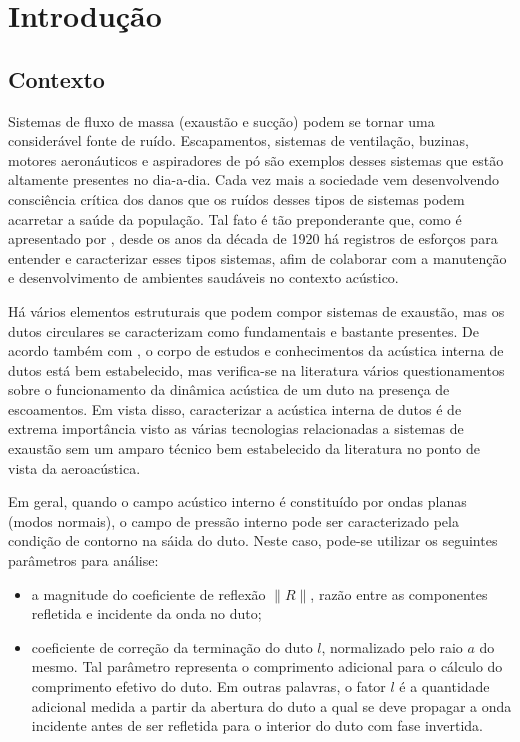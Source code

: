 \chapter{Introdução}
\label{chapter:introdcao}

\section{Contexto}

Sistemas de fluxo de massa (exaustão e sucção) podem se tornar uma considerável fonte de ruído. Escapamentos, sistemas de ventilação, buzinas, motores aeronáuticos e aspiradores de pó são exemplos desses sistemas que estão altamente presentes no dia-a-dia. Cada vez mais a sociedade vem desenvolvendo consciência crítica dos danos que os ruídos desses tipos de sistemas podem acarretar a saúde da população. Tal fato é tão preponderante que, como é apresentado por , desde os anos da década de 1920 há registros de esforços para entender e caracterizar esses tipos sistemas, afim de colaborar com a manutenção e desenvolvimento de ambientes saudáveis no contexto acústico.

Há vários elementos estruturais que podem compor sistemas de exaustão, mas os dutos circulares se caracterizam como fundamentais e bastante presentes. De acordo também com , o corpo de estudos e conhecimentos da acústica interna de dutos está bem estabelecido, mas verifica-se na literatura vários questionamentos sobre o funcionamento da dinâmica acústica de um duto na presença de escoamentos. Em vista disso, caracterizar a acústica interna de dutos é de extrema importância visto as várias tecnologias relacionadas a sistemas de exaustão sem um amparo técnico bem estabelecido da literatura no ponto de vista da aeroacústica.

Em geral, quando o campo acústico interno é constituído por ondas planas (modos normais), o campo de pressão interno pode ser caracterizado pela condição de contorno na sáida do duto. Neste caso, pode-se utilizar os seguintes parâmetros para análise:

\begin{itemize}
    \item a magnitude do coeficiente de reflexão $\|R\|$, razão entre as componentes refletida e incidente da onda no duto;
    

    \item coeficiente de correção da terminação do duto $l$, normalizado pelo raio $a$ do mesmo. Tal parâmetro representa o comprimento adicional para o cálculo do comprimento efetivo do duto. Em outras palavras, o fator $l$ é a quantidade adicional medida a partir da abertura do duto a qual se deve propagar a onda incidente antes de ser refletida para o interior do duto com fase invertida.
\end{itemize}


